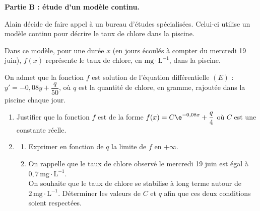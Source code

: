 \medskip

\textbf{Partie B : étude d'un modèle continu.}

\smallskip

Alain décide de faire appel à un bureau d'études spécialisées. Celui-ci utilise un modèle continu pour décrire le taux de chlore dans la piscine.

Dans ce modèle, pour une durée $x$ (en jours écoulés à compter du mercredi 19 juin), $f(x)$ représente le taux de chlore, en $  \mathrm{mg}\cdot \mathrm{L}^{-1}$, dans la piscine.

On admet que la fonction $f$ est solution de l'équation différentielle $(E)$ : $y'=-0,08 y+\dfrac{q}{50}$, où $q$ est la quantité de chlore, en gramme, rajoutée dans la piscine chaque jour.

\begin{enumerate}
	\item Justifier que la fonction $f$ est de la forme $f(x)=C \e^{-0,08 x}+\dfrac{q}{4}$ où $C$ est une constante réelle.

	\item \begin{enumerate}
		\item  Exprimer en fonction de $q$ la limite de $f$ en $+\infty$.

		\item  On rappelle que le taux de chlore observé le mercredi 19 juin est égal à $0,7\, \mathrm{mg \cdot L}^{-1}$.\\ On souhaite que le taux de chlore se stabilise à long terme autour de $2\, \mathrm{mg \cdot L}^{-1}$. Déterminer les valeurs de $C$ et $q$ afin que ces deux conditions soient respectées.
	\end{enumerate}
\end{enumerate}

\medskip
